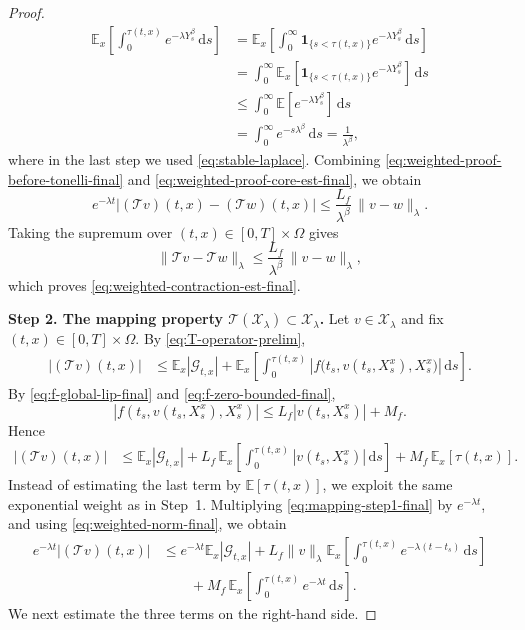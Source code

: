 \documentclass[a4paper,fleqn]{cas-sc}
\begin{document}
\begin{proof}
\begin{align}
\mathbb{E}_x\!\left[
\int_0^{\tau(t,x)} e^{-\lambda Y_s^\beta}\,\mathrm{d}s
\right]
&=
\mathbb{E}_x\!\left[
\int_0^\infty \mathbf{1}_{\{s<\tau(t,x)\}} e^{-\lambda Y_s^\beta}\,\mathrm{d}s
\right]
\nonumber\\
&=
\int_0^\infty
\mathbb{E}_x\!\left[
\mathbf{1}_{\{s<\tau(t,x)\}} e^{-\lambda Y_s^\beta}
\right]
\,\mathrm{d}s
\nonumber\\
&\le
\int_0^\infty
\mathbb{E}\!\left[e^{-\lambda Y_s^\beta}\right]
\,\mathrm{d}s
\nonumber\\
&=
\int_0^\infty e^{-s\lambda^\beta}\,\mathrm{d}s
=
\frac{1}{\lambda^\beta},
\label{eq:weighted-proof-core-est-final}
\end{align}
where in the last step we used \eqref{eq:stable-laplace}. Combining \eqref{eq:weighted-proof-before-tonelli-final} and \eqref{eq:weighted-proof-core-est-final}, we obtain
\[
e^{-\lambda t}|(\mathcal{T}v)(t,x)-(\mathcal{T}w)(t,x)|
\le
\frac{L_f}{\lambda^\beta}\,\|v-w\|_\lambda.
\]
Taking the supremum over $(t,x)\in[0,T]\times\Omega$ gives
\[
\|\mathcal{T}v-\mathcal{T}w\|_\lambda
\le
\frac{L_f}{\lambda^\beta}\,\|v-w\|_\lambda,
\]
which proves \eqref{eq:weighted-contraction-est-final}.

\medskip
\noindent
\textbf{Step 2. The mapping property $\mathcal{T}(\mathcal{X}_\lambda)\subset\mathcal{X}_\lambda$.}
Let $v\in\mathcal{X}_\lambda$ and fix $(t,x)\in[0,T]\times\Omega$. By \eqref{eq:T-operator-prelim},
\begin{align}
|(\mathcal{T}v)(t,x)|
&\le
\mathbb{E}_x|\mathcal{G}_{t,x}|
+
\mathbb{E}_x\!\left[
\int_0^{\tau(t,x)}
\left|f\!\bigl(t_s,v(t_s,X_s^x),X_s^x\bigr)\right|
\,\mathrm{d}s
\right].
\label{eq:mapping-step1-final}
\end{align}
By \eqref{eq:f-global-lip-final} and \eqref{eq:f-zero-bounded-final},
\[
|f(t_s,v(t_s,X_s^x),X_s^x)|
\le
L_f|v(t_s,X_s^x)|+M_f.
\]
Hence
\begin{align}
|(\mathcal{T}v)(t,x)|
&\le
\mathbb{E}_x|\mathcal{G}_{t,x}|
+
L_f\,
\mathbb{E}_x\!\left[
\int_0^{\tau(t,x)}
|v(t_s,X_s^x)|\,\mathrm{d}s
\right]
+
M_f\,\mathbb{E}_x[\tau(t,x)].
\label{eq:mapping-step2-rough-final}
\end{align}
Instead of estimating the last term by $\mathbb{E}[\tau(t,x)]$, we exploit the same exponential weight as in Step~1. Multiplying \eqref{eq:mapping-step1-final} by $e^{-\lambda t}$, and using \eqref{eq:weighted-norm-final}, we obtain
\begin{align}
e^{-\lambda t}|(\mathcal{T}v)(t,x)|
&\le
e^{-\lambda t}\mathbb{E}_x|\mathcal{G}_{t,x}|
+
L_f\|v\|_\lambda
\mathbb{E}_x\!\left[
\int_0^{\tau(t,x)}
e^{-\lambda(t-t_s)}\,\mathrm{d}s
\right]
\nonumber\\
&\qquad
+
M_f\,
\mathbb{E}_x\!\left[
\int_0^{\tau(t,x)} e^{-\lambda t}\,\mathrm{d}s
\right].
\label{eq:mapping-step3-final}
\end{align}
We next estimate the three terms on the right-hand side.


\end{proof}
\end{document}
